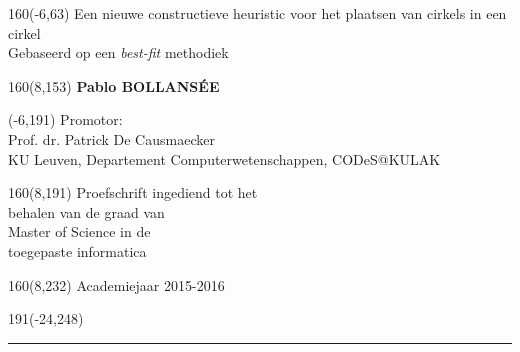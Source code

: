 \documentclass[12pt,a4paper,oneside]{book}
\begin{document}
%
\begin{textblock}{160}(-6,63)
\textblockcolour{}
\vspace{-\parskip}
\flushleft
\fontsize{40}{42}\selectfont \textcolor{bluetitle}{Een nieuwe constructieve heuristic voor het plaatsen van cirkels in een cirkel}\\[1.5mm]
\fontsize{20}{22}\selectfont Gebaseerd op een \textit{best-fit} methodiek
\end{textblock}
%
\begin{textblock}{160}(8,153)
\textblockcolour{}
\vspace{-\parskip}
\flushright
\fontsize{14}{16}\selectfont \textbf{Pablo BOLLANSÉE}
\end{textblock}
%
\begin{textblock}{70}(-6,191)
\textblockcolour{}
\vspace{-\parskip}
\flushleft
Promotor:\\ Prof. dr. Patrick De Causmaecker \\[-2pt]
\textcolor{blueaff}{KU Leuven, Departement Computerwetenschappen, CODeS@KULAK}\\[5pt]
\end{textblock}
%
\begin{textblock}{160}(8,191)
\textblockcolour{}
\vspace{-\parskip}
\flushright
Proefschrift ingediend tot het\\[4.5pt]
behalen van de graad van\\[4.5pt]
Master of Science in de\\[4.5pt]
toegepaste informatica\\
\end{textblock}
%
\begin{textblock}{160}(8,232)
\textblockcolour{}
\vspace{-\parskip}
\flushright
Academiejaar 2015-2016
\end{textblock}
%
\begin{textblock}{191}(-24,248)
{\color{blueline}\rule{550pt}{5.5pt}}
\end{textblock}
%
\vfill
\end{document}
